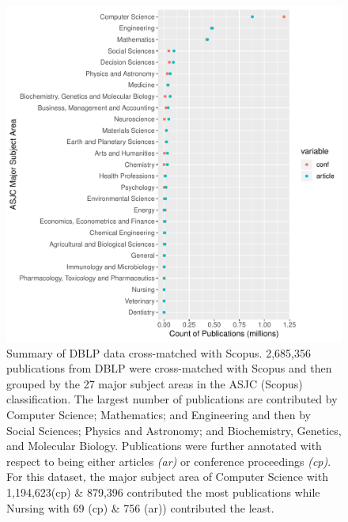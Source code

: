 \begin{figure}[ht]
  \includegraphics[scale=0.6]{ar_cp_ratio.pdf}
\caption{Summary of DBLP data cross-matched with Scopus. 2,685,356 publications from DBLP were cross-matched with Scopus and then grouped by the 27 major subject areas in the ASJC (Scopus) classification. The largest number of publications are contributed by Computer Science; Mathematics; and Engineering and then by Social Sciences; Physics and Astronomy; and Biochemistry, Genetics, and Molecular Biology. Publications were further annotated with respect to being either articles \emph{(ar)} or conference proceedings \emph{(cp)}. For this dataset, the major subject area of Computer Science with 1,194,623(cp) \& 879,396 contributed the most publications while Nursing with 69 (cp) \& 756 (ar)) contributed the least.}
\label{fig:ar_cp_annotation}       %
\end{figure}

\newpage

